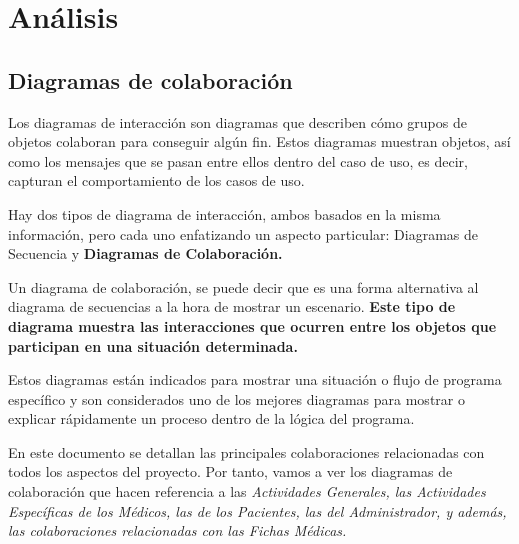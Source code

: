 \documentclass[a4paper,oneside,11pt]{book}
\begin{document}
	
\chapter{Análisis} %
\label{cha:analisis}

	\section{Diagramas de colaboración} %
	\label{sec:diagramas_de_colaboracion}
	
		Los diagramas de interacción son diagramas que describen cómo grupos de objetos colaboran para conseguir algún fin. Estos diagramas muestran objetos, así como los mensajes que se pasan entre ellos dentro del caso de uso, es decir, capturan el comportamiento de los casos de uso.
		
		Hay dos tipos de diagrama de interacción, ambos basados en la misma información, pero cada uno enfatizando un aspecto particular: Diagramas de Secuencia y \textbf{Diagramas de Colaboración.}
	
		Un diagrama de colaboración, se puede decir que es una forma alternativa al diagrama de secuencias a la hora de mostrar un escenario. \textbf{Este tipo de diagrama muestra las interacciones que ocurren entre los objetos que participan en una situación determinada.}

		\medskip
		
		
		\medskip
			
		Estos diagramas están indicados para mostrar una situación o flujo de programa específico y son considerados uno de los mejores diagramas para mostrar o explicar rápidamente un proceso dentro de la lógica del programa.
		
		En este documento se detallan las principales colaboraciones relacionadas con todos los aspectos del proyecto. Por tanto, vamos a ver los diagramas de colaboración que hacen referencia a las \textit{Actividades Generales, las Actividades Específicas de los Médicos, las de los Pacientes, las del Administrador, y además, las colaboraciones relacionadas con las Fichas Médicas.}
		
	



\end{document}

